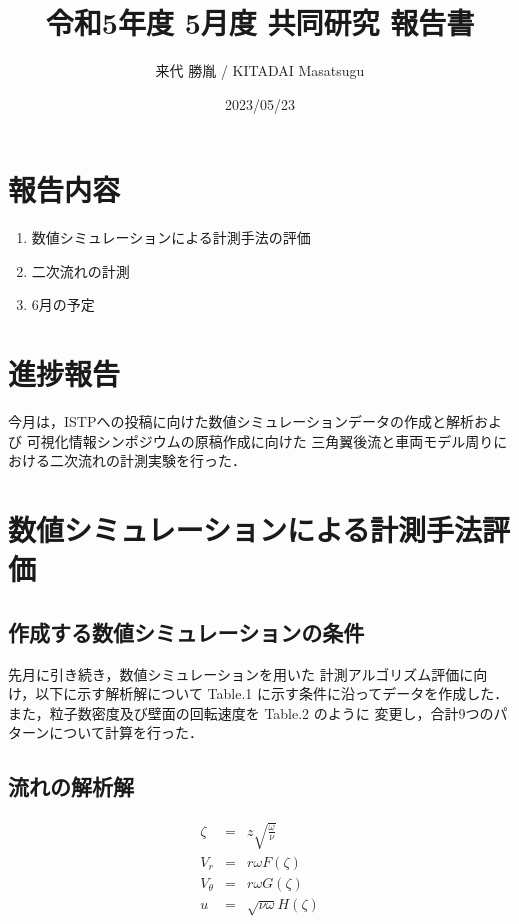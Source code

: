 \documentclass[twocolumn,a4j]{jsarticle}
\author{来代 勝胤 / KITADAI Masatsugu}
\title{令和5年度 5月度 共同研究 報告書}
\date{2023/05/23}
\begin{document}
\columnseprule=0.1mm
\maketitle

\section*{報告内容}
\begin{enumerate}[1.]
  \item 数値シミュレーションによる計測手法の評価
  \item 二次流れの計測
  \item 6月の予定
\end{enumerate}

\section*{進捗報告}
今月は，ISTPへの投稿に向けた数値シミュレーションデータの作成と解析および
可視化情報シンポジウムの原稿作成に向けた
三角翼後流と車両モデル周りにおける二次流れの計測実験を行った．

\section{数値シミュレーションによる計測手法評価}
\subsection{作成する数値シミュレーションの条件}
先月に引き続き，数値シミュレーションを用いた
計測アルゴリズム評価に向け，以下に示す解析解について
Table.1 に示す条件に沿ってデータを作成した．
また，粒子数密度及び壁面の回転速度を Table.2 のように
変更し，合計9つのパターンについて計算を行った．\\

\subsection*{流れの解析解}
\begin{eqnarray*}
  \zeta &=& z \sqrt{\frac{\omega}{\nu}}\\
  V_r &=& r \omega F \left(\zeta\right)\\
  V_\theta &=& r \omega G \left(\zeta\right)\\
  u &=& \sqrt{\nu \omega} H \left(\zeta\right)
\end{eqnarray*}
\end{document}
